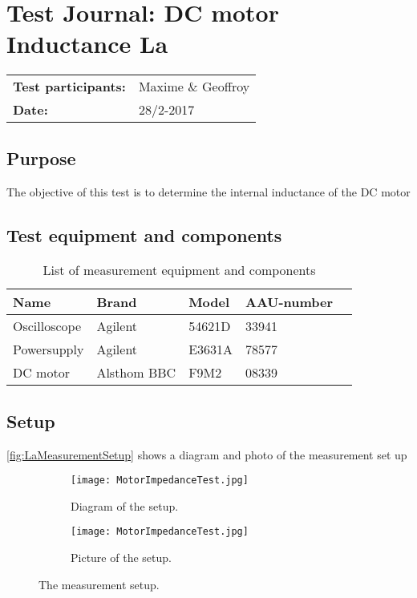 \graphicspath{{figures/appendix/}}
\chapter{Test Journal: DC motor Inductance La}
\begin{table}[!h]
\begin{tabular}{l l}
\textbf{Test participants:} & Maxime \& Geoffroy  \\
\textbf{Date:}  & 28/2-2017
\end{tabular}
\end{table}

\section*{Purpose}
The objective of this test is to determine the internal inductance of the DC motor
\section*{Test equipment and components}
\begin{table}[h]
	\centering
	\caption{List of measurement equipment and components}\label{tab_appendix:template}

	\begin{tabularx}{\textwidth}{lXXXX}
		Name 				& Brand	& Model & AAU-number									\\ \toprule \rowcolor{lightGrey}
		Oscilloscope	& Agilent & 54621D & 33941 	\\
		Powersupply	& Agilent & E3631A & 78577\\ \rowcolor{lightGrey}
		DC motor & Alsthom BBC & F9M2& 08339
	\end{tabularx}
\end{table}
\section*{Setup}
\autoref{fig:LaMeasurementSetup} shows a diagram and photo of the measurement set up
\begin{figure}[htbp]
	\centering
	\begin{subfigure}{0.50\textwidth}
		\texttt{[image: MotorImpedanceTest.jpg]}
		\caption{Diagram of the setup.} \label{fig:LaMeasurementDiagram}
	\end{subfigure}
	\begin{subfigure}{0.40\textwidth}
		\texttt{[image: MotorImpedanceTest.jpg]}
		\caption{Picture of the setup.} \label{fig:LaMeasurementPictures}
	\end{subfigure}
	\caption{The measurement setup.} \label{fig:LaMeasurementSetup}   
\end{figure}

